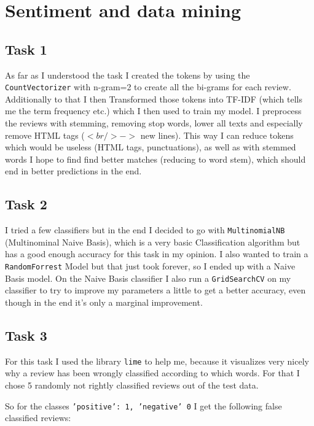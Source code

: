 \documentclass[11pt,a4paper]{article}
\begin{document}
\section{Sentiment and data mining}

\subsection{Task 1}
As far as I understood the task I created the tokens by using the \texttt{CountVectorizer} with n-gram=2 to create all the bi-grams for each review.
Additionally to that I then Transformed those tokens into TF-IDF (which tells me the term frequency etc.) which I then used to train my model.
I preprocess the reviews with stemming, removing stop words, lower all texts and especially remove HTML tags ($<br /> ->$ new lines).
This way I can reduce tokens which would be useless (HTML tags, punctuations), as well as with stemmed words I hope to find find better matches (reducing to word stem), which should end in better predictions in the end.


\subsection{Task 2}
I tried a few classifiers but in the end I decided to go with \texttt{MultinomialNB} (Multinominal Naive Basis), which is a very basic Classification algorithm but has a good enough accuracy for this task in my opinion.
I also wanted to train a \texttt{RandomForrest} Model but that just took forever, so I ended up with a Naive Basis model.
On the Naive Basis classifier I also run a \texttt{GridSearchCV} on my classifier to try to improve my parameters a little to get a better accuracy, even though in the end it's only a marginal improvement.



\subsection{Task 3}

For this task I used the library \texttt{lime} to help me, because it visualizes very nicely why a review has been wrongly classified according to which words.
For that I chose 5 randomly not rightly classified reviews out of the test data.

So for the classes \texttt{{'positive': 1, 'negative' 0}} I get the following false classified reviews:










\end{document}
